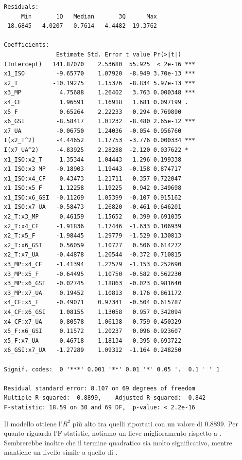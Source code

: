 \begin{lstlisting}[style=rconsole,caption={fit0000}]
Residuals:
     Min       1Q   Median       3Q      Max
-18.6845  -4.0207   0.7614   4.4482  19.3762

Coefficients:
               Estimate Std. Error t value Pr(>|t|)
(Intercept)   141.87070    2.53680  55.925  < 2e-16 ***
x1_ISO         -9.65770    1.07920  -8.949 3.70e-13 ***
x2_T          -10.19275    1.15376  -8.834 5.97e-13 ***
x3_MP           4.75688    1.26402   3.763 0.000348 ***
x4_CF           1.96591    1.16918   1.681 0.097199 .
x5_F            0.65264    2.22233   0.294 0.769890
x6_GSI         -8.58417    1.01232  -8.480 2.65e-12 ***
x7_UA          -0.06750    1.24036  -0.054 0.956760
I(x2_T^2)      -4.44652    1.17753  -3.776 0.000334 ***
I(x7_UA^2)     -4.83925    2.28288  -2.120 0.037622 *
x1_ISO:x2_T     1.35344    1.04443   1.296 0.199338
x1_ISO:x3_MP   -0.18903    1.19443  -0.158 0.874717
x1_ISO:x4_CF    0.43473    1.21711   0.357 0.722047
x1_ISO:x5_F     1.12258    1.19225   0.942 0.349698
x1_ISO:x6_GSI  -0.11269    1.05399  -0.107 0.915162
x1_ISO:x7_UA   -0.58473    1.26820  -0.461 0.646201
x2_T:x3_MP      0.46159    1.15652   0.399 0.691035
x2_T:x4_CF     -1.91836    1.17446  -1.633 0.106939
x2_T:x5_F      -1.98445    1.29779  -1.529 0.130813
x2_T:x6_GSI     0.56059    1.10727   0.506 0.614272
x2_T:x7_UA     -0.44878    1.20544  -0.372 0.710815
x3_MP:x4_CF    -1.41394    1.22579  -1.153 0.252690
x3_MP:x5_F     -0.64495    1.10750  -0.582 0.562230
x3_MP:x6_GSI   -0.02745    1.18863  -0.023 0.981640
x3_MP:x7_UA     0.19452    1.10813   0.176 0.861172
x4_CF:x5_F     -0.49071    0.97341  -0.504 0.615787
x4_CF:x6_GSI    1.08155    1.13058   0.957 0.342094
x4_CF:x7_UA     0.80578    1.06138   0.759 0.450329
x5_F:x6_GSI     0.11572    1.20237   0.096 0.923607
x5_F:x7_UA      0.46718    1.18134   0.395 0.693722
x6_GSI:x7_UA   -1.27289    1.09312  -1.164 0.248250
---
Signif. codes:  0 '***' 0.001 '**' 0.01 '*' 0.05 '.' 0.1 ' ' 1

Residual standard error: 8.107 on 69 degrees of freedom
Multiple R-squared:  0.8899,    Adjusted R-squared:  0.842
F-statistic: 18.59 on 30 and 69 DF,  p-value: < 2.2e-16
\end{lstlisting}

Il modello \texttt{} ottiene l'$R^2$ più alto tra quelli riportati con un valore di 0.8899. Per quanto riguarda l'F-statistic, notiamo un lieve miglioramento rispetto a \texttt{}. Sembrerebbe inoltre che il termine quadratico \texttt{} sia molto significativo, mentre \texttt{} mantiene un livello simile a quello di \texttt{}.

